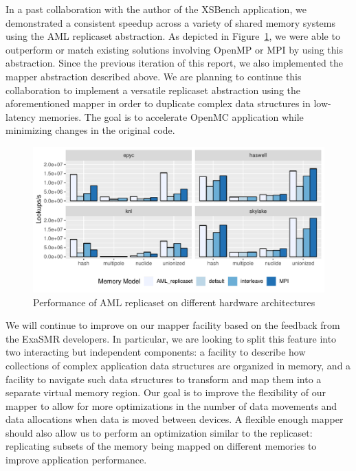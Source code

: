 In a past collaboration with the author of the XSBench application, we
demonstrated a consistent speedup across a variety of shared memory systems
using the AML replicaset abstraction. As depicted in Figure~\ref{fig:aml-performance}, we were
able to outperform or match existing solutions involving OpenMP or MPI by
using this abstraction. Since the previous iteration of this report, we
also implemented the mapper abstraction described above. We are planning to
continue this collaboration to implement a versatile replicaset abstraction
using the aforementioned mapper in order to duplicate complex data
structures in low-latency memories. The goal is to accelerate OpenMC
application while minimizing changes in the original code.
\begin{figure}[htb]
\centering
\includegraphics[width=.8\textwidth]{projects/2.3.1-PMR/2.3.1.19-Argo-PowerSteering/aml-xsbench}
\caption{Performance of AML replicaset on different hardware
architectures}
    \label{fig:aml-performance}
\end{figure}

We will continue to improve on our mapper facility based on the feedback
from the ExaSMR developers. In particular, we are looking to split this
feature into two interacting but independent components: a facility to
describe how collections of complex application data structures are
organized in memory, and a facility to navigate such data structures to
transform and map them into a separate virtual memory region. Our goal is
to improve the flexibility of our mapper to allow for more optimizations in
the number of data movements and data allocations when data is moved
between devices. A flexible enough mapper should also allow us to perform
an optimization similar to the replicaset: replicating subsets of the
memory being mapped on different memories to improve application
performance.
